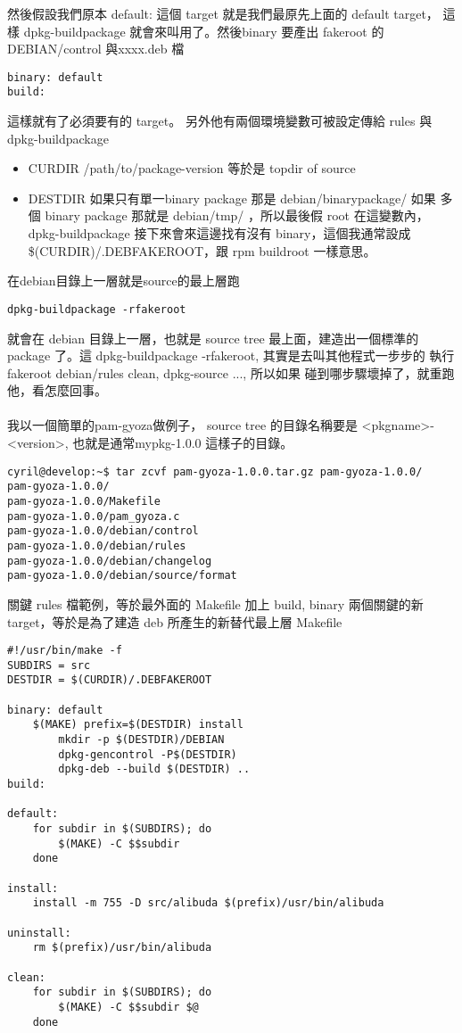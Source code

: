   然後假設我們原本 default: 這個 target 就是我們最原先上面的 default target，
  這樣 dpkg-buildpackage 就會來叫用了。然後binary 要產出 fakeroot 的
  DEBIAN/control 與xxxx.deb 檔
  \begin{verbatim}
binary: default
build:
  \end{verbatim}
  這樣就有了必須要有的 target。 另外他有兩個環境變數可被設定傳給 rules 與
  dpkg-buildpackage
  \begin{itemize}
    \item CURDIR /path/to/package-version 等於是 topdir of source
    \item DESTDIR 如果只有單一binary package 那是 debian/binarypackage/ 如果
      多個 binary package 那就是 debian/tmp/ ，所以最後假 root 在這變數內，
      dpkg-buildpackage 接下來會來這邊找有沒有 binary，這個我通常設成
      \$(CURDIR)/.DEBFAKEROOT，跟 rpm buildroot 一樣意思。
  \end{itemize}
  在debian目錄上一層就是source的最上層跑
  \begin{verbatim}
dpkg-buildpackage -rfakeroot
  \end{verbatim}
  就會在 debian 目錄上一層，也就是 source tree 最上面，建造出一個標準的 
  package 了。這 dpkg-buildpackage -rfakeroot, 其實是去叫其他程式一步步的
  執行fakeroot debian/rules clean, dpkg-source ..., 所以如果
  碰到哪步驟壞掉了，就重跑他，看怎麼回事。
  \\\\
  我以一個簡單的pam-gyoza做例子， source tree 的目錄名稱要是 
  <pkgname>-<version>, 也就是通常mypkg-1.0.0 這樣子的目錄。
  \begin{verbatim}
cyril@develop:~$ tar zcvf pam-gyoza-1.0.0.tar.gz pam-gyoza-1.0.0/
pam-gyoza-1.0.0/
pam-gyoza-1.0.0/Makefile
pam-gyoza-1.0.0/pam_gyoza.c
pam-gyoza-1.0.0/debian/control
pam-gyoza-1.0.0/debian/rules
pam-gyoza-1.0.0/debian/changelog
pam-gyoza-1.0.0/debian/source/format
  \end{verbatim}
  關鍵 rules 檔範例，等於最外面的 Makefile 加上 build, binary 兩個關鍵的新
  target，等於是為了建造 deb 所產生的新替代最上層 Makefile
  \begin{verbatim}
#!/usr/bin/make -f
SUBDIRS = src
DESTDIR = $(CURDIR)/.DEBFAKEROOT

binary: default
	$(MAKE) prefix=$(DESTDIR) install
        mkdir -p $(DESTDIR)/DEBIAN
        dpkg-gencontrol -P$(DESTDIR)
        dpkg-deb --build $(DESTDIR) ..
build:

default:
	for subdir in $(SUBDIRS); do
		$(MAKE) -C $$subdir
	done

install:
	install -m 755 -D src/alibuda $(prefix)/usr/bin/alibuda

uninstall:
	rm $(prefix)/usr/bin/alibuda

clean:
	for subdir in $(SUBDIRS); do
		$(MAKE) -C $$subdir $@
	done
  \end{verbatim}
